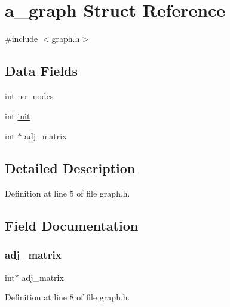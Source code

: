 \hypertarget{structa__graph}{}\section{a\+\_\+graph Struct Reference}
\label{structa__graph}


{\ttfamily \#include $<$graph.\+h$>$}

\subsection*{Data Fields}
\begin{DoxyCompactItemize}
\item 
int \hyperlink{structa__graph_aedec94f21ea36fb82d6fbf7847428504}{no\+\_\+nodes}
\item 
int \hyperlink{structa__graph_a795ea50921b36311ffd5e7baa2ef1f7e}{init}
\item 
int $\ast$ \hyperlink{structa__graph_a8ebe6252e3afd51a39bde3fddb4fc054}{adj\+\_\+matrix}
\end{DoxyCompactItemize}


\subsection{Detailed Description}


Definition at line 5 of file graph.\+h.



\subsection{Field Documentation}
\mbox{\label{structa__graph_a8ebe6252e3afd51a39bde3fddb4fc054}} 
\subsubsection{\texorpdfstring{adj\+\_\+matrix}{adj\_matrix}}
{\footnotesize\ttfamily int$\ast$ adj\+\_\+matrix}



Definition at line 8 of file graph.\+h.

\mbox{\label{structa__graph_a795ea50921b36311ffd5e7baa2ef1f7e}} 
